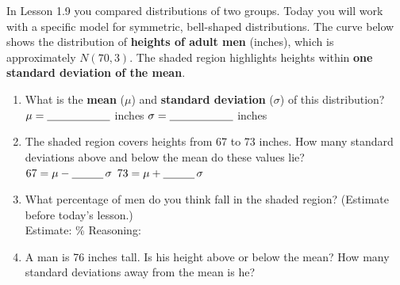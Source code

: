 \documentclass[10pt]{article}
\begin{document}

\vspace{0.16in}

\noindent In Lesson 1.9 you compared distributions of two groups.
Today you will work with a specific model for symmetric, bell-shaped distributions.
The curve below shows the distribution of \textbf{heights of adult men} (inches),
which is approximately $N(70, 3)$. The shaded region highlights heights within
\textbf{one standard deviation of the mean}.

\vspace{0.18in}

\begin{center}
\end{center}

\vspace{0.20in}

\begin{enumerate}[leftmargin=1.5em, itemsep=10pt]

  \item What is the \textbf{mean} ($\mu$) and \textbf{standard deviation} ($\sigma$)
        of this distribution?\\[6pt]
        $\mu = \blank{2cm}$ inches \qquad $\sigma = \blank{2cm}$ inches

  \item The shaded region covers heights from 67 to 73 inches.
        How many standard deviations above and below the mean do these values lie?\\[6pt]
        $67 = \mu - \blank{1cm}\,\sigma$ \qquad $73 = \mu + \blank{1cm}\,\sigma$

  \item What percentage of men do you think fall in the shaded region?
        (Estimate before today's lesson.)\\[6pt]
        Estimate: \blank{3cm}\% \quad Reasoning: \blank{8cm}

  \item A man is 76 inches tall. Is his height above or below the mean?
        How many standard deviations away from the mean is he?\\[6pt]
        \writeline

\end{enumerate}
\end{document}
